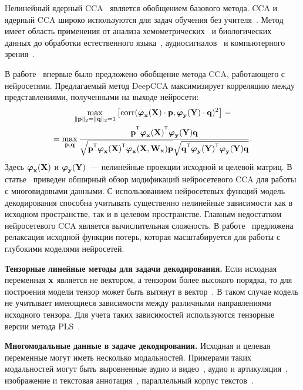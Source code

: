 Нелинейный ядерный CCA~\cite{akaho2006kernel,melzer2001nonlinear,bach2002kernel,hardoon2004canonical} является обобщением базового метода. 
CCA и ядерный CCA широко используются для задач обучения без учителя~\cite{hardoon2007unsupervised,vinokourov2003inferring}. 
Метод имеет область применения от анализа хемометрических~\cite{montanarella1995chemometric} и биологических~\cite{vert2003graph} данных до обработки естественного языка~\cite{haghighi2008learning,dhillon2011multi}, аудиосигналов~\cite{choukri1986adaptation,rudzicz2010adaptive} и компьютерного зрения~\cite{kim2007tensor}.

В работе~\cite{andrew2013deep} впервые было предложено обобщение метода CCA, работающего с нейросетями. 
Предлагаемый метод DeepCCA максимизирует корреляцию между представлениями, полученными на выходе нейросети:
\begin{multline}
	\max_{\|\bp\|_{2}=\|\bq\|_{2}=1}\left[ \text{corr}(\bphi_{\bx}(\bX) \cdot \bp, \bphi_{\by}(\bY) \cdot \bq)^{2}\right] = \\ = \max_{\bp, \bq} \frac{\bp^{\T} \bphi_{\bx}(\bX)^{\T} \bphi_{\by}(\bY) \bq}{\sqrt{\bp^{\T} \bphi_{\bx}(\bX)^{\T}  \bphi_{\bx}(\bX, \bW_{\bx}) \bp} \sqrt{\bq^{\T} \bphi_{\by}(\bY)^{\T}  \bphi_{\by}(\bY) \bq}}.
	\label{ch1:eq:depp_cca_max_corr}
\end{multline}
Здесь $\boldsymbol{\varphi}_{\mathbf{x}}(\mathbf{X})$ и $\boldsymbol{\varphi}_{\mathbf{y}}(\mathbf{Y})$~--- нелинейные проекции исходной и целевой матриц.
В статье~\cite{wang2015deep} приведен обширный обзор модификаций нейросетевого CCA для работы с многовидовыми данными.
С использованием нейросетевых функций модель декодирования способна учитывать существенно нелинейные зависимости как в исходном пространстве, так и в целевом пространстве.
Главным недостатком нейросетевого CCA является вычислительная сложность. 
В работе~\cite{chang2018scalable} предложена релаксация исходной функции потерь, которая масштабируется для работы с глубокими моделями нейросетей.

\vspace{0.5cm}
\textbf{Тензорные линейные методы для задачи декодирования.}
Если исходная переменная $\mathbf{x}$ является не вектором, а тензором более высокого порядка, то для построения модели тензор может быть вытянут в вектор~\cite{cichocki2009nonnegative}. 
В таком случае модель не учитывает имеющиеся зависимости между различными направлениями исходного тензора.
Для учета таких зависимостей используются тензорные версии метода PLS~\cite{zhao2012higher,eliseyev2013recursive,eliseyev2016penalized}.


\vspace{0.5cm}
\textbf{Многомодальные данные в задаче декодирования.}
Исходная и целевая переменные могут иметь несколько модальностей. 
Примерами таких модальностей могут быть выровненные аудио и видео~\cite{kidron2005pixels,chaudhuri2009multi}, аудио и артикуляция~\cite{arora2012kernel}, изображение и текстовая аннотация~\cite{hardoon2004canonical,socher2010connecting,hodosh2013framing}, параллельный корпус текстов~\cite{vinokourov2003inferring,haghighi2008learning,ap2014autoencoder,faruqui2014improving}.


